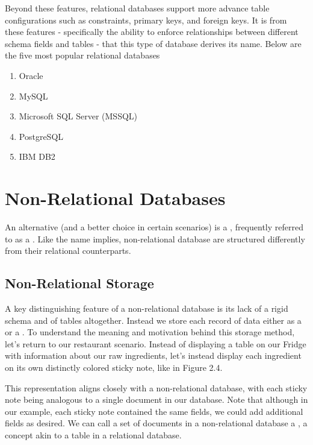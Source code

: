 Beyond these features, relational databases support more advance table configurations such as constraints, primary keys, and foreign keys. It is from these features - specifically the ability to enforce relationships between different schema fields and tables - that this type of database derives its name. Below are the five most popular relational databases

\begin{enumerate}
    \item Oracle
    \item MySQL
    \item Microsoft SQL Server (MSSQL)
    \item PostgreSQL
    \item IBM DB2
\end{enumerate}

\section{Non-Relational Databases}

An alternative (and a better choice in certain scenarios) is a , frequently referred to as a . Like the name implies, non-relational database are structured differently from their relational counterparts. 

\subsection*{Non-Relational Storage}

A key distinguishing feature of a non-relational database is its lack of a rigid schema and of tables altogether. Instead we store each record of data either as a  or a . To understand the meaning and motivation behind this storage method, let's return to our restaurant scenario. Instead of displaying a table on our Fridge with information about our raw ingredients, let's instead display each ingredient on its own distinctly colored sticky note, like in Figure 2.4.


This representation aligns closely with a non-relational database, with each sticky note being analogous to a single document in our database. Note that although in our example, each sticky note contained the same fields, we could add additional fields as desired. We can call a set of documents in a non-relational database a , a concept akin to a table in a relational database.

